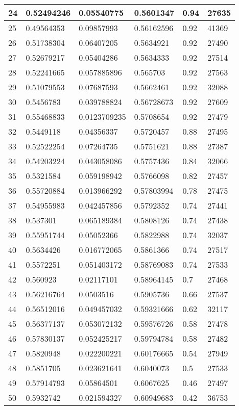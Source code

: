 \begin{longtable}{|l|l|l|l|l|l|}
24 & 0.52494246 & 0.05540775 & 0.5601347 & 0.94 & 27635 \\ \hline 
25 & 0.49564353 & 0.09857993 & 0.56162596 & 0.92 & 41369 \\ \hline 
26 & 0.51738304 & 0.06407205 & 0.5634921 & 0.92 & 27490 \\ \hline 
27 & 0.52679217 & 0.05404286 & 0.5634333 & 0.92 & 27514 \\ \hline 
28 & 0.52241665 & 0.057885896 & 0.565703 & 0.92 & 27563 \\ \hline 
29 & 0.51079553 & 0.07687593 & 0.5662461 & 0.92 & 32088 \\ \hline 
30 & 0.5456783 & 0.039788824 & 0.56728673 & 0.92 & 27609 \\ \hline 
31 & 0.55468833 & 0.0123709235 & 0.5708654 & 0.92 & 27479 \\ \hline 
32 & 0.5449118 & 0.04356337 & 0.5720457 & 0.88 & 27495 \\ \hline 
33 & 0.52522254 & 0.07264735 & 0.5751621 & 0.88 & 27387 \\ \hline 
34 & 0.54203224 & 0.043058086 & 0.5757436 & 0.84 & 32066 \\ \hline 
35 & 0.5321584 & 0.059198942 & 0.5766098 & 0.82 & 27457 \\ \hline 
36 & 0.55720884 & 0.013966292 & 0.57803994 & 0.78 & 27475 \\ \hline 
37 & 0.54955983 & 0.042457856 & 0.5792352 & 0.74 & 27441 \\ \hline 
38 & 0.537301 & 0.065189384 & 0.5808126 & 0.74 & 27438 \\ \hline 
39 & 0.55951744 & 0.05052366 & 0.5822988 & 0.74 & 32037 \\ \hline 
40 & 0.5634426 & 0.016772065 & 0.5861366 & 0.74 & 27517 \\ \hline 
41 & 0.5572251 & 0.051403172 & 0.58769083 & 0.74 & 27533 \\ \hline 
42 & 0.560923 & 0.02117101 & 0.58964145 & 0.7 & 27468 \\ \hline 
43 & 0.56216764 & 0.0503516 & 0.5905736 & 0.66 & 27537 \\ \hline 
44 & 0.56512016 & 0.049457032 & 0.59321666 & 0.62 & 32117 \\ \hline 
45 & 0.56377137 & 0.053072132 & 0.59576726 & 0.58 & 27478 \\ \hline 
46 & 0.57830137 & 0.052425217 & 0.59794784 & 0.58 & 27482 \\ \hline 
47 & 0.5820948 & 0.022200221 & 0.60176665 & 0.54 & 27949 \\ \hline 
48 & 0.5851705 & 0.023621641 & 0.6040073 & 0.5 & 27533 \\ \hline 
49 & 0.57914793 & 0.05864501 & 0.6067625 & 0.46 & 27497 \\ \hline 
50 & 0.5932742 & 0.021594327 & 0.60949683 & 0.42 & 36753 \\ \hline 
\end{longtable}